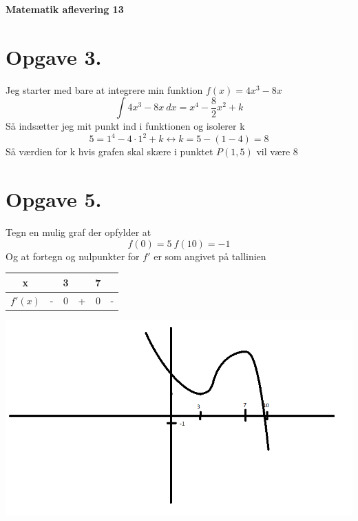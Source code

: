 \documentclass[12pt]{article}
\begin{document}
\Large{\textbf{Matematik aflevering 13}}
\normalsize

\section*{Opgave 3.}
Jeg starter med bare at integrere min funktion $f(x)=4x^3-8x$
$$\int 4x^3-8x \ dx = x^4-\frac{8}{2}x^2+k$$
Så indsætter jeg mit punkt ind i funktionen og isolerer k
$$5=1^4-4 \cdot 1^2+k \leftrightarrow k=5-(1-4)=8$$
Så værdien for k hvis grafen skal skære i punktet $P(1,5)$ vil være $8$

\section*{Opgave 5.}
Tegn en mulig graf der opfylder at
$$f(0)=5 \ f(10)=-1$$
Og at fortegn og nulpunkter for $f'$ er som angivet på tallinien
\begin{center}
  \begin{tabular}{c c c c c c}
    x && 3 && 7 &\\
    \hline
    $f'(x)$ & - & 0 & + & 0 & -
  \end{tabular}
\end{center}

\includegraphics[width=\textwidth]{Graf1mat13.png}
\end{document}
